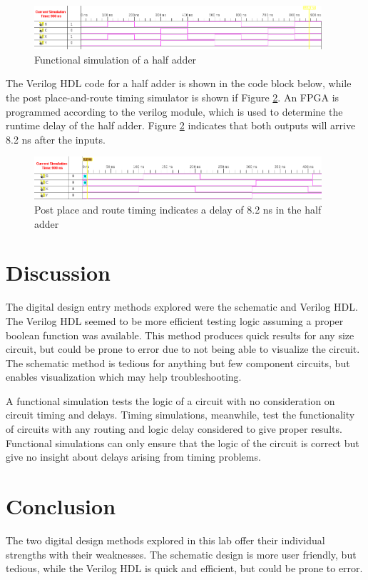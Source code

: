 \documentclass[11pt]{article}
\begin{document}
\begin{figure}[htbp]
	\centering
	\includegraphics[width=0.95\textwidth, draft=false]{functional_sim}
	\caption{Functional simulation of a half adder}
	\label{fig:functional_sim}
\end{figure}

The Verilog HDL code for a half adder is shown in the code block below, while the post place-and-route timing simulator is shown if Figure \ref{fig:timing}. An FPGA is programmed according to the verilog module, which is used to determine the runtime delay of the half adder. Figure \ref{fig:timing} indicates that both outputs will arrive 8.2 ns after the inputs.

\hspace{1cm}



\begin{figure}[htbp]
	\centering
	\includegraphics[width=0.95\textwidth, draft=false]{post_place_timing}
	\caption{Post place and route timing indicates a delay of 8.2 ns in the half adder}
	\label{fig:timing}
\end{figure}

\newpage

\section{Discussion}

The digital design entry methods explored were the schematic and Verilog HDL. The Verilog HDL seemed to be more efficient testing logic assuming a proper boolean function was available. This method produces quick results for any size circuit, but could be prone to error due to not being able to visualize the circuit. The schematic method is tedious for anything but few component circuits, but enables visualization which may help troubleshooting.

A functional simulation tests the logic of a circuit with no consideration on circuit timing and delays. Timing simulations, meanwhile, test the functionality of circuits with any routing and logic delay considered to give proper results. Functional simulations can only ensure that the logic of the circuit is correct but give no insight about delays arising from timing problems.



\section{Conclusion}

The two digital design methods explored in this lab offer their individual strengths with their weaknesses. The schematic design is more user friendly, but tedious, while the Verilog HDL is quick and efficient, but could be prone to error. 
\end{document}
